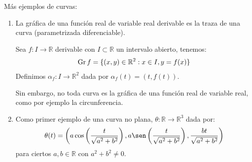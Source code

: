 \begin{ejemplo}
    Más ejemplos de curvas:
    \begin{enumerate}
        \item La gráfica de una función real de variable real derivable es la traza de una curva (parametrizada diferenciable).

            Sea $f:I\to \mathbb{R}$ derivable con $I\subset \mathbb{R}$ un intervalo abierto, tenemos:
            \begin{equation*}
                \operatorname{Gr} f = \{(x,y) \in \mathbb{R}^2 : x\in I, y=f(x)\}
            \end{equation*}
            Definimos $\alpha_f:I\to \mathbb{R}^2$ dada por $\alpha_f(t) = (t,f(t))$.

            Sin embargo, no toda curva es la gráfica de una función real de variable real, como por ejemplo la circunferencia.
        \item Como primer ejemplo de una curva no plana, $\theta:\mathbb{R}\to \mathbb{R}^3$ dada por:
            \begin{equation*}
                \theta(t) = \left(a\cos\left(\frac{t}{\sqrt{a^2+b^2}}\right), a\sen\left(\frac{t}{\sqrt{a^2+b^2}}\right), \frac{bt}{\sqrt{a^2+b^2}}\right)
            \end{equation*}
            para ciertos $a,b\in \mathbb{R}$ con $a^2 + b^2 \neq 0$.



\end{enumerate}
\end{ejemplo}
